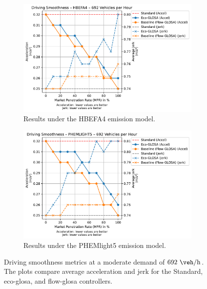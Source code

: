 \begin{figure}[htb]
  \centering
  \begin{subfigure}[b]{0.45\textwidth}
    \includegraphics[width=\textwidth]{data/img/DrivingSmoothness/DrivingSmoothness_HBEFA4_Cars692.pdf}
    \caption{Results under the HBEFA4 emission model.}
    \label{fig:Smoothness_HBEFA4_692}
  \end{subfigure}\hfill
  \begin{subfigure}[b]{0.45\textwidth}
    \includegraphics[width=\textwidth]{data/img/DrivingSmoothness/DrivingSmoothness_PHEMLIGHT5_Cars692.pdf}
    \caption{Results under the PHEMlight5 emission model.}
    \label{fig:Smoothness_PHEMlight5_692}
  \end{subfigure}
  \caption[Driving smoothness metrics at $692~\unit{\veh\per\hour}$]{Driving smoothness metrics at a moderate demand of $692~\unit{\veh\per\hour}$. The plots compare average acceleration and jerk for the Standard, \ac{eco-glosa}, and \ac{flow-glosa} controllers.}
  \label{fig:Smoothness_692}
\end{figure}

